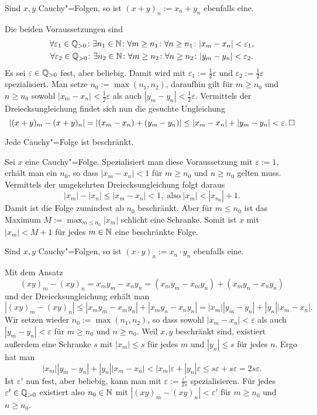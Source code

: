 \begin{Satz}
Sind $x,y$ Cauchy"=Folgen, so ist $(x+y)_n := x_n+y_n$ ebenfalls eine.
\end{Satz}
\begin{Beweis}
Die beiden Voraussetzungen sind
\begin{gather*}
\forall\varepsilon_1\in\mathbb Q_{>0}\colon\exists n_1\in\mathbb N\colon
  \forall m\ge n_1\colon\forall n\ge n_1\colon |x_m-x_n|<\varepsilon_1,\\
\forall\varepsilon_2\in\mathbb Q_{>0}\colon\exists n_2\in\mathbb N\colon
  \forall m\ge n_2\colon\forall n\ge n_2\colon |y_m-y_n|<\varepsilon_2.
\end{gather*}
Es sei $\varepsilon\in\mathbb Q_{>0}$ fest, aber beliebig. Damit wird mit
$\varepsilon_1:=\tfrac{1}{2}\varepsilon$ und $\varepsilon_2:=\tfrac{1}{2}\varepsilon$
spezialisiert. Man setze $n_0:=\max(n_1,n_2)$, daraufhin gilt für $m\ge n_0$ und $n\ge n_0$ sowohl
$|x_m-x_n|<\tfrac{1}{2}\varepsilon$ als auch $|y_m-y_n|<\tfrac{1}{2}\varepsilon$.
Vermittels der Dreiecksungleichung findet sich nun die gesuchte Ungleichung
\[|(x+y)_m - (x+y)_n| = |(x_m-x_n) + (y_m-y_n)| \le |x_m-x_n| + |y_m-y_n| < \varepsilon.\,\Box\]
\end{Beweis}

\begin{Satz}
Jede Cauchy"=Folge ist beschränkt.
\end{Satz}
\begin{Beweis}
Sei $x$ eine Cauchy"=Folge. Spezialisiert man diese Voraussetzung mit
$\varepsilon:=1$, erhält man ein $n_0$, so dass $|x_m-x_n|<1$ für
$m\ge n_0$ und $n\ge n_0$ gelten muss. Vermittels der umgekehrten
Dreiecksungleichung folgt daraus
\[|x_m|-|x_n| \le |x_m-x_n| < 1,\;\text{also}\; |x_m| < |x_{n_0}| + 1.\]
Damit ist die Folge zumindest ab $n_0$ beschränkt. Aber für
$m\le n_0$ ist das Maximum $M:=\max_{m\le n_0} |x_m|$ schlicht eine
Schranke. Somit ist $x$ mit $|x_m| < M + 1$ für jedes $m\in\mathbb N$
eine beschränkte Folge.\,\qedsymbol
\end{Beweis}

\begin{Satz}
Sind $x,y$ Cauchy"=Folgen, so ist $(x\cdot y)_n := x_n\cdot y_n$ ebenfalls eine.
\end{Satz}
\begin{Beweis}
Mit dem Ansatz
\[(xy)_m - (xy)_n = x_m y_m - x_n y_n = (x_m y_m - x_m y_n) + (x_m y_n - x_n y_n)\]
und der Dreiecksungleichung erhält man
\[|(xy)_m - (xy)_n| \le |x_m y_m - x_m y_n| + |x_m y_n - x_n y_n|
= |x_m||y_m-y_n| + |y_n||x_m-x_n|.\]
Wir setzen wieder $n_0:=\max(n_1,n_2)$, so dass sowohl $|x_m-x_n|<\varepsilon$
als auch $|y_m-y_n|<\varepsilon$ für $m\ge n_0$ und $n\ge n_0$. Weil $x,y$
beschränkt sind, existiert außerdem eine Schranke $s$ mit $|x_m|\le s$
für jedes $m$ und $|y_n|\le s$ für jedes $n$. Ergo hat man
\[|x_m||y_m-y_n| + |y_n||x_m-x_n| < |x_m|\varepsilon + |y_n|\varepsilon
\le s\varepsilon + s\varepsilon = 2s\varepsilon.\]
Ist $\varepsilon'$ nun fest, aber beliebig, kann man mit
$\varepsilon:=\frac{\varepsilon'}{2s}$ spezialisieren. Für jedes $\varepsilon'\in\mathbb Q_{>0}$
existiert also $n_0\in\mathbb N$ mit $|(xy)_m - (xy)_n| < \varepsilon'$
für $m\ge n_0$ und $n\ge n_0$.\,\qedsymbol
\end{Beweis}

